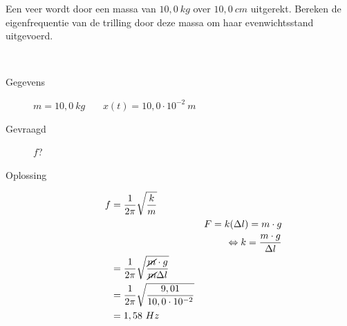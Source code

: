 \documentclass{ximera}
\begin{document}
    \author{Ingmar Herreman}
    \date{Januari 2024}

    \begin{exercise}     
        Een veer wordt door een massa van $10,0 \ kg$ over $10,0 \ cm$ uitgerekt. Bereken de eigenfrequentie van de trilling door deze massa om haar evenwichtsstand uitgevoerd.
        \begin{oplossing} \ \\
            \begin{description}
                \item [Gegevens] $m=10,0 \ kg$ \ \ \ $x(t)=10,0\cdot 10^{-2} \ m$
                \item [Gevraagd] $f$?
                \item [Oplossing] 
                \begin{align*}
                    f&=\dfrac{1}{2\pi}\sqrt{\dfrac{k}{m}}\\
                    && F=k(\Delta l)=m\cdot g \\
                    && \Leftrightarrow k=\frac{m\cdot g}{\Delta l} \\
                    &=\dfrac{1}{2\pi}\sqrt{\dfrac{\cancel{m}\cdot g}{\cancel{m}\Delta l}}\\
                    &=\dfrac{1}{2\pi}\sqrt{\dfrac{9,01}{10,0\cdot 10^{-2}}}\\
                    &=1,58 \ Hz
                \end{align*}
            \end{description}
        \end{oplossing}
    \end{exercise}
    
\end{document}
